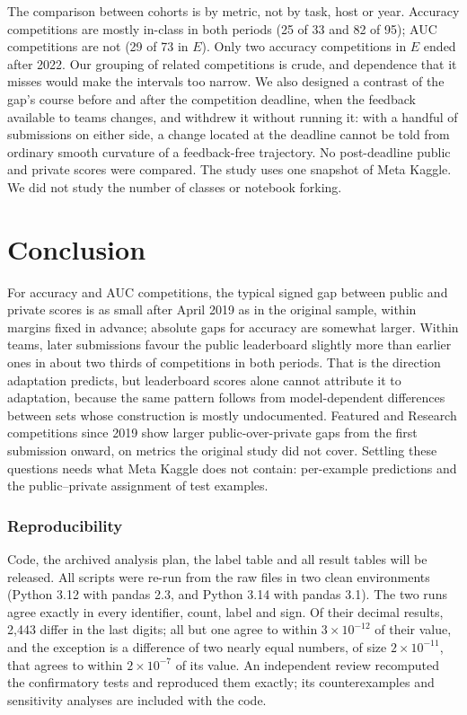 \documentclass[10pt]{article}
\begin{document}
The comparison between cohorts is by metric, not by task, host or year. Accuracy competitions are mostly in-class in both periods (25 of 33 and 82 of 95); AUC competitions are not (29 of 73 in $E$). Only two accuracy competitions in $E$ ended after 2022. Our grouping of related competitions is crude, and dependence that it misses would make the intervals too narrow. We also designed a contrast of the gap's course before and after the competition deadline, when the feedback available to teams changes, and withdrew it without running it: with a handful of submissions on either side, a change located at the deadline cannot be told from ordinary smooth curvature of a feedback-free trajectory. No post-deadline public and private scores were compared. The study uses one snapshot of Meta Kaggle. We did not study the number of classes or notebook forking.

\section{Conclusion}

For accuracy and AUC competitions, the typical signed gap between public and private scores is as small after April 2019 as in the original sample, within margins fixed in advance; absolute gaps for accuracy are somewhat larger. Within teams, later submissions favour the public leaderboard slightly more than earlier ones in about two thirds of competitions in both periods. That is the direction adaptation predicts, but leaderboard scores alone cannot attribute it to adaptation, because the same pattern follows from model-dependent differences between sets whose construction is mostly undocumented. Featured and Research competitions since 2019 show larger public-over-private gaps from the first submission onward, on metrics the original study did not cover. Settling these questions needs what Meta Kaggle does not contain: per-example predictions and the public--private assignment of test examples.

\subsubsection*{Reproducibility}
Code, the archived analysis plan, the label table and all result tables will be released. All scripts were re-run from the raw files in two clean environments (Python 3.12 with pandas 2.3, and Python 3.14 with pandas 3.1). The two runs agree exactly in every identifier, count, label and sign. Of their decimal results, 2,443 differ in the last digits; all but one agree to within $3\times10^{-12}$ of their value, and the exception is a difference of two nearly equal numbers, of size $2\times10^{-11}$, that agrees to within $2\times10^{-7}$ of its value. An independent review recomputed the confirmatory tests and reproduced them exactly; its counterexamples and sensitivity analyses are included with the code.



\end{document}
